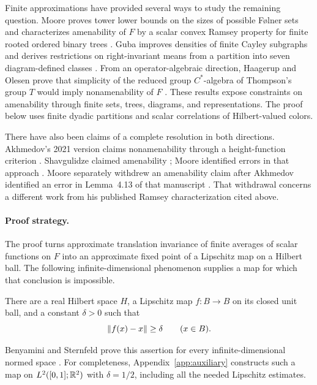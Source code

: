 Finite approximations have provided several ways to study the remaining
question. Moore proves tower lower bounds on the sizes of possible
F\o lner sets \cite[Theorem~1.1]{MooreFolner2013} and characterizes
amenability of \(F\) by a scalar convex Ramsey property for finite rooted
ordered binary trees \cite[Theorem~3.1]{Moore2013}. Guba improves densities
of finite Cayley subgraphs \cite{Guba2025Density} and derives restrictions
on right-invariant means from a partition into seven diagram-defined
classes \cite{Guba2026}. From an operator-algebraic
direction, Haagerup and Olesen prove that simplicity of the reduced group
\(C^*\)-algebra of Thompson's group \(T\) would imply nonamenability of
\(F\) \cite[Theorem~5.5]{HaagerupOlesen2017}. These results expose constraints
on amenability through finite sets, trees, diagrams, and representations.
The proof below uses finite dyadic partitions and scalar correlations of
Hilbert-valued colors.

There have also been claims of a complete resolution in both directions.
Akhmedov's 2021 version claims nonamenability through a height-function
criterion \cite{Akhmedov2021}. Shavgulidze claimed amenability
\cite{Shavgulidze2009}; Moore identified errors in that approach
\cite{Moore2011Critique}. Moore separately withdrew an amenability claim
after Akhmedov identified an error in Lemma~4.13 of that manuscript
\cite{Moore2012Withdrawn}. That withdrawal concerns a different work from
his published Ramsey characterization cited above.

\paragraph{Proof strategy.}
The proof turns approximate translation invariance of finite averages of
scalar functions on \(F\) into an approximate fixed point of a Lipschitz
map on a Hilbert ball. The
following infinite-dimensional phenomenon supplies a map for which that
conclusion is impossible.

\begin{lemma}\label{lem:displacement}
There are a real Hilbert space \(H\), a Lipschitz map \(f:B\to B\) on its
closed unit ball, and a constant \(\delta>0\) such that
\[
  \lVert f(x)-x\rVert\ge\delta\qquad(x\in B).
\]
\end{lemma}

Benyamini and Sternfeld prove this assertion for every infinite-dimensional
normed space \cite[Theorem, part~(3), p.~439]{BenyaminiSternfeld1983}.
For completeness, Appendix~\ref{app:auxiliary} constructs such a map on
\(L^2([0,1];\mathbb R^2)\) with \(\delta=1/2\), including all the needed
Lipschitz estimates.

